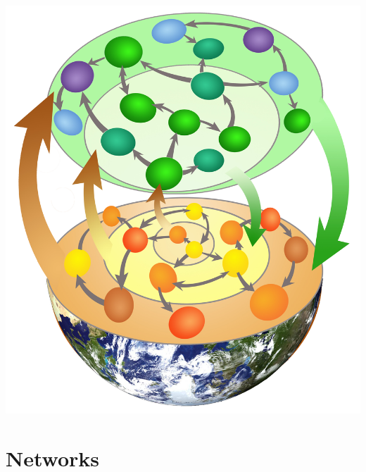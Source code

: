 \documentclass{eecslides}
\begin{document}
	\begin{frame}
		\begin{center}
		\includegraphics[height=0.85\textheight]{lab_logo}\\
		\end{center}	  	    
	\end{frame}

	\section{Networks}
\end{document}
